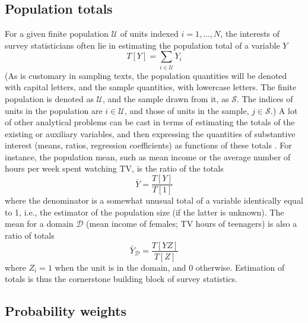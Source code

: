 \subsection{Population totals}
\label{subsec:totals}

For a given finite population $\mathcal U$ of units indexed $i=1,\ldots,N$,
the interests of survey statisticians often lie in estimating the
population total of a variable $Y$
\begin{equation}
   T[Y] = \sum_{i \in \mathcal{U}} Y_i
   \label{eq:total:pop}
\end{equation}
(As is customary in sampling texts, the population quantities will be denoted
with capital letters, and the sample quantities, with lowercase letters.
The finite population is denoted as $\mathcal{U}$, and the sample drawn from it,
as $\mathcal{S}$. The indices of units in the population are $i\in \mathcal{U}$, and
those of units in the sample, $j \in \mathcal{S}$.)
A lot of other analytical problems can be cast in terms of estimating
the totals of the existing or auxiliary variables, and then expressing
the quantities of substantive interest (means, ratios, regression
coefficients) as functions of these totals \citep{skinner:1989}.
For instance, the population mean,
such as mean income or
the average number of hours per week spent watching TV,
is the ratio of the totals
$$
    \bar Y = \frac{T[Y]}{T[1]}
$$
where the denominator is a somewhat unusual total of a variable
identically equal to 1, i.e., the estimator of the population size
(if the latter is unknown). The mean for a domain $\mathcal{D}$
(mean income of females; TV hours of teenagers) is also a ratio of totals
$$
    \bar Y_\mathcal{D} = \frac{T[YZ]}{T[Z]}
$$
where $Z_i=1$ when the unit is in the domain, and 0 otherwise.
Estimation of totals is thus the cornerstone building block of survey
statistics.

\subsection{Probability weights}

